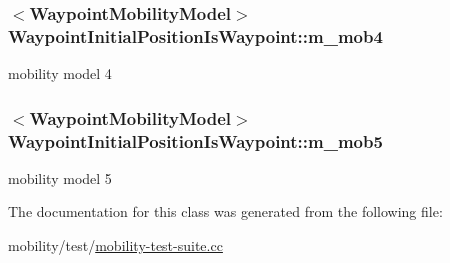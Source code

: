 \subsubsection[{\texorpdfstring{m\+\_\+mob4}{m_mob4}}]{$<${\bf Waypoint\+Mobility\+Model}$>$ Waypoint\+Initial\+Position\+Is\+Waypoint\+::m\+\_\+mob4\hspace{0.3cm}{\ttfamily [private]}}\hypertarget{classWaypointInitialPositionIsWaypoint_a314ea7cc7f3a519067fb64153e6f3e2f}{}\label{classWaypointInitialPositionIsWaypoint_a314ea7cc7f3a519067fb64153e6f3e2f}


mobility model 4 

\subsubsection[{\texorpdfstring{m\+\_\+mob5}{m_mob5}}]{$<${\bf Waypoint\+Mobility\+Model}$>$ Waypoint\+Initial\+Position\+Is\+Waypoint\+::m\+\_\+mob5\hspace{0.3cm}{\ttfamily [private]}}\hypertarget{classWaypointInitialPositionIsWaypoint_a450fe8fc533ad5fe8a6940f21b148f5f}{}\label{classWaypointInitialPositionIsWaypoint_a450fe8fc533ad5fe8a6940f21b148f5f}


mobility model 5 



The documentation for this class was generated from the following file\+:\begin{DoxyCompactItemize}
\item 
mobility/test/\hyperlink{mobility-test-suite_8cc}{mobility-\/test-\/suite.\+cc}\end{DoxyCompactItemize}
